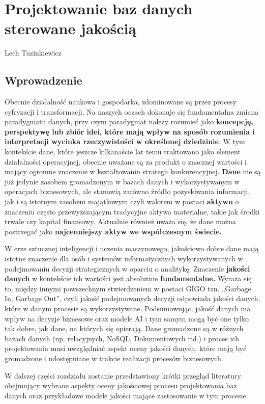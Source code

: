 \chapter[Projektowanie baz \ldots]{Projektowanie baz danych sterowane jakością}
\thispagestyle{empty}
\vspace{-8mm} {\large Lech Tuzinkiewicz} \vspace{8mm}

\section{Wprowadzenie}
Obecnie działalność naukowa i gospodarka, zdominowane są przez procesy cyfryzacji i transformacji. Na naszych oczach dokonuje się fundamentalna zmiana paradygmatu danych, przy czym paradygmat należy rozumieć jako \textbf{koncepcję, perspektywę lub zbiór idei, które mają wpływ na sposób rozumienia i interpretacji wycinka rzeczywistości w określonej dziedzinie}. W tym kontekście dane, które jeszcze kilkanaście lat temu traktowano jako element działalności operacyjnej, obecnie uważane są za produkt o znacznej wartości i mający ogromne znaczenie w kształtowaniu strategii konkurencyjnej. \textbf{Dane} nie są już jedynie zasobem gromadzonym w bazach danych i wykorzystywanym w operacjach biznesowych, ale stanowią zarówno źródło pozyskiwania informacji, jak i są istotnym zasobem majątkowym czyli walorem w postaci \textbf{aktywu }o znaczeniu często przewyższającym tradycyjne aktywa materialne, takie jak środki trwałe czy kapitał finansowy. Aktualnie również uważa się, że dane można postrzegać jako \textbf{najcenniejszy aktyw we współczesnym świecie.}

W erze sztucznej inteligencji i uczenia maszynowego, jakościowo dobre dane mają istotne znaczenie dla osób i systemów informatycznych wykorzystywanych w podejmowaniu decyzji strategicznych w oparciu o analitykę. Znaczenie \textbf{jakości danych} w kontekście ich wartości jest absolutnie \textbf{fundamentalne. }Wyraża się to, między innymi powszechnym stwierdzeniem w postaci GIGO tzn. „Garbage In, Garbage Out”, czyli jakość podejmowanych decyzji odpowiada jakości danych, które w danym procesie są wykorzystywane. Podsumowując, jakość danych ma wpływ na decyzje biznesowe oraz modele AI i tym samym mogą być one tylko tak dobre, jak dane, na których się opierają.
Dane gromadzone są w różnych bazach danych (np. relacyjnych, NoSQL, Dokumentowych itd.) i proces ich projektowania musi uwzględniać aspekt oceny jakości danych, które mają być gromadzone i udostępniane w trakcie realizacji procesów biznesowych. 

W dalszej części rozdziału zostanie przedstawiony krótki przegląd literatury obejmujący wybrane aspekty oceny jakościowej procesu projektowania baz danych oraz przykładowe modele jakości mające zastosowanie w tym procesie. 


